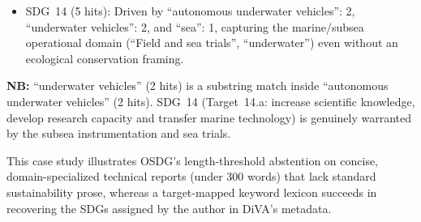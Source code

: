 \begin{casestudySection}
\begin{itemize}
    \item \gls{SDG}~14 (\num{5} hits): Driven by \enquote{autonomous underwater vehicles}: 2, \enquote{underwater vehicles}: 2, and \enquote{sea}: 1, capturing the marine/subsea operational domain (\enquote{Field and sea trials}, \enquote{underwater}) even without an ecological conservation framing.
\end{itemize}

\textbf{NB:} \enquote{underwater vehicles} (\num{2} hits) is a substring match inside \enquote{autonomous underwater vehicles} (\num{2} hits). \gls{SDG}~14 (Target~14.a: increase scientific knowledge, develop research capacity and transfer marine technology) is genuinely warranted by the subsea instrumentation and sea trials.
\end{casestudySection}

\begin{takeaway}
This case study illustrates OSDG's length-threshold abstention on concise, domain-specialized technical reports (under \num{300} words) that lack standard sustainability prose, whereas a target-mapped keyword lexicon succeeds in recovering the \glspl{SDG} assigned by the author in \gls{DiVA}'s metadata.
\end{takeaway}

